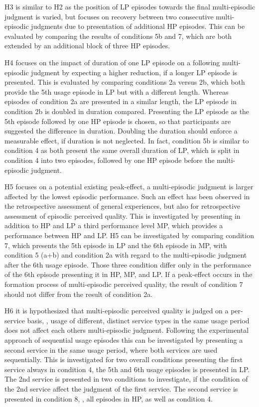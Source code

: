 H3 is similar to H2 as the position of \ac{LP} episodes towards the final multi-episodic judgment is varied, but focuses on recovery between two consecutive multi-episodic judgments due to presentation of additional \ac{HP} episodes.
This can be evaluated by comparing the results of conditions 5b and 7, which are both extended by an additional block of three \ac{HP} episodes.

H4 focuses on the impact of duration of one \ac{LP} episode on a following multi-episodic judgment by expecting a higher reduction, if a longer \ac{LP} episode is presented.
This is evaluated by comparing conditions 2a versus 2b, which both provide the 5th usage episode in \ac{LP} but with a different length.
Whereas episodes of condition 2a are presented in a similar length, the \ac{LP} episode in condition 2b is doubled in duration compared.
Presenting the \ac{LP} episode as the 5th episode followed by one \ac{HP} episode is chosen, so that participants are suggested the difference in duration.
Doubling the duration should enforce a measurable effect, if duration is not neglected.
In fact, condition 5b is similar to condition 4 as both present the same overall duration of \ac{LP}, which is split in condition 4 into two episodes, followed by one \ac{HP} episode before the multi-episodic judgment.

H5 focuses on a potential existing peak-effect, \ie a multi-episodic judgment is larger affected by the lowest episodic performance. 
Such an effect has been observed in the retrospective assessment of general experiences, but also for retrospective assessment of episodic perceived quality.
This is investigated by presenting in addition to \ac{HP} and \ac{LP} a third performance level \ac{MP}, which provides a performance between \ac{HP} and \ac{LP}.
H5 can be investigated by comparing condition 7, which presents the 5th episode in \ac{LP} and the 6th episode in \ac{MP}, with condition 5 (a+b) and condition 2a with regard to the multi-episodic judgment after the 6th usage episode.
Those three condition differ only in the performance of the 6th episode presenting it in \ac{HP}, \ac{MP}, and \ac{LP}.
If a peak-effect occurs in the formation process of multi-episodic perceived quality, the result of condition 7 should not differ from the result of condition 2a.

H6 it is hypothesized that multi-episodic perceived quality is judged on a per-service basis, \ie, usage of different, distinct service types in the same usage period does not affect each others multi-episodic judgment.
Following the experimental approach of sequential usage episodes this can be investigated by presenting a second service in the same usage period, where both services are used sequentially.
This is investigated for two overall conditions presenting the first service always in condition 4, \ie the 5th and 6th usage episodes is presented in \ac{LP}.
The 2nd service is presented in two conditions to investigate, if the condition of the 2nd service affect the judgment of the first service.
The second service is presented in condition 8, \ie, all episodes in \ac{HP}, as well as condition 4.

